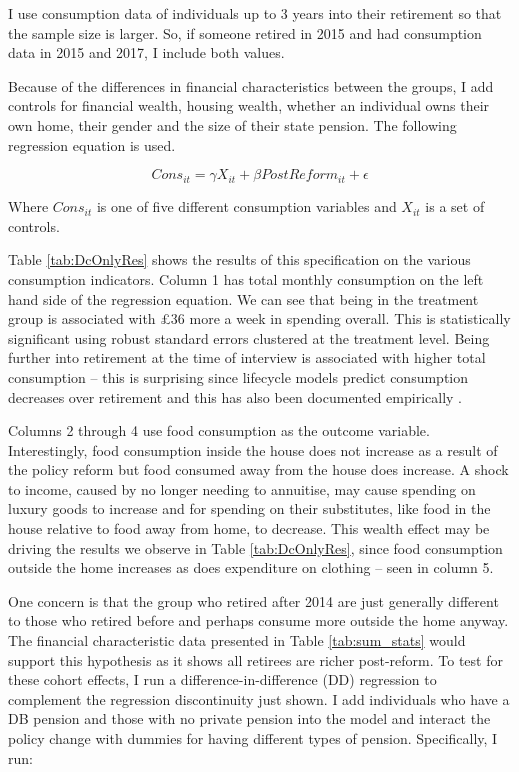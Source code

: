 \documentclass[12pt]{article}
\begin{document}
I use consumption data of individuals up to 3 years into their retirement so
that the sample size is larger. So, if someone retired in 2015 and had
consumption data in 2015 and 2017, I include both values.

Because of the differences in financial characteristics between the groups, I
add controls for financial wealth, housing wealth, whether an individual owns
their own home, their gender and the size of their state pension. The following
regression equation is used.

\begin{equation*}
    Cons_{it} =  \gamma X_{it} + \beta PostReform_{it} + \epsilon
\end{equation*}

Where $Cons_{it}$ is one of five different consumption variables and $X_{it}$ is
a set of controls.

Table \ref{tab:DcOnlyRes} shows the results of this specification on the various
consumption indicators. Column 1 has total monthly consumption on the left hand
side of the regression equation. We can see that being in the treatment group is
associated with £36 more a week in spending overall. This is statistically
significant using robust standard errors clustered at the treatment level. Being
further into retirement at the time of interview is associated with higher total
consumption -- this is surprising since lifecycle models predict consumption
decreases over retirement and this has also been documented empirically
\citep{hurd_rohwedder_nber_2003}.

Columns 2 through 4 use food consumption as the outcome variable. Interestingly,
food consumption inside the house does not increase as a result of the policy
reform but food consumed away from the house does increase. A shock to income,
caused by no longer needing to annuitise, may cause spending on luxury goods to
increase and for spending on their substitutes, like food in the house relative
to food away from home, to decrease. This wealth effect may be driving the
results we observe in Table \ref{tab:DcOnlyRes}, since food consumption outside the
home increases as does expenditure on clothing -- seen in column 5.

One concern is that the group who retired after 2014 are just generally
different to those who retired before and perhaps consume more outside the home
anyway. The financial characteristic data presented in Table \ref{tab:sum_stats}
would support this hypothesis as it shows all retirees are richer post-reform.
To test for these cohort effects, I run a difference-in-difference (DD)
regression to complement the regression discontinuity just shown. I add
individuals who have a DB pension and those with no private pension into the
model and interact the policy change with dummies for having different types of
pension. Specifically, I run:
\end{document}
